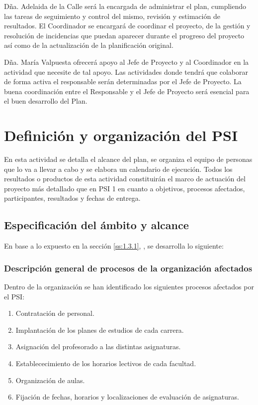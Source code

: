 \documentclass[11pt,a4paper,spanish,twoside]{report}
\begin{document}
Dña. Adelaida de la Calle será la encargada de administrar el plan,
cumpliendo las tareas de seguimiento y control del mismo, revisión y 
estimación de resultados. El Coordinador se encargará de coordinar el
proyecto, de la gestión y resolución de incidencias que puedan aparecer 
durante el progreso del proyecto así como de la actualización de la 
planificación original.

Dña. María Valpuesta ofrecerá apoyo al Jefe de Proyecto y al Coordinador en
la actividad que necesite de tal apoyo. Las actividades donde tendrá que 
colaborar de forma activa el responsable serán determinadas por el Jefe de 
Proyecto. La buena coordinación entre el Responsable y el Jefe de Proyecto 
será esencial para el buen desarrollo del Plan.


\chapter{Definición y organización del PSI}
En esta actividad se detalla el alcance del plan, se organiza el equipo de
personas que lo va a llevar a cabo y se elabora un calendario de
ejecución. Todos los resultados o productos de esta actividad constituirán el
marco de actuación del proyecto más detallado que en PSI 1 en cuanto a
objetivos, procesos afectados, participantes, resultados y fechas de
entrega. 

\section{Especificación del ámbito y alcance}
En base a lo expuesto en la sección \vref{ss:1.3.1}, \emph{},
se desarrolla lo siguiente:

\subsection{Descripción general de procesos de la organización afectados}
\label{ss:2.1.1}
Dentro de la organización se han identificado los siguientes procesos afectados 
por el PSI:
\begin{enumerate}
  \item Contratación de personal.
  \item Implantación de los planes de estudios de cada carrera.
  \item Asignación del profesorado a las distintas asignaturas.
  \item Establececimiento de los horarios lectivos de cada facultad.
  \item Organización de aulas.
  \item Fijación de fechas, horarios y localizaciones de evaluación de
    asignaturas. 
\end{enumerate}
\end{document}
